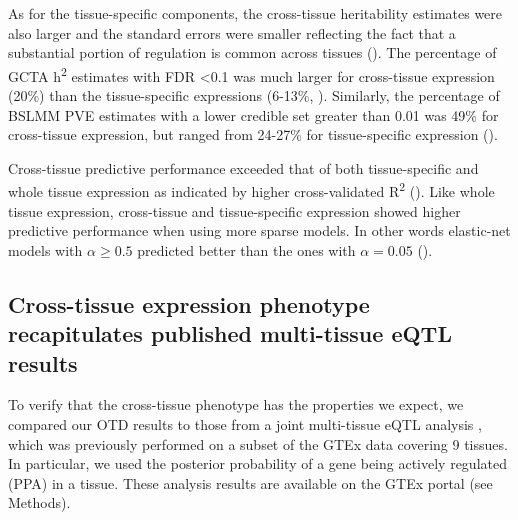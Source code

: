 \documentclass[10pt,letterpaper]{article}
\begin{document}
As for the tissue-specific components, 
the cross-tissue heritability estimates were also larger and the standard errors were smaller reflecting the fact that a substantial portion of regulation is common across tissues (). The percentage of GCTA h\textsuperscript{2} estimates with FDR \textless{0.1}  was much larger for cross-tissue expression (20\%) than the tissue-specific expressions (6-13\%, ). Similarly, the percentage of BSLMM PVE estimates with a lower credible set greater than 0.01 was 49\% for cross-tissue expression, but ranged from 24-27\% for tissue-specific expression ().

Cross-tissue predictive performance exceeded that of both tissue-specific and whole tissue expression as indicated by higher cross-validated R\textsuperscript{2} (). Like whole tissue expression, cross-tissue and tissue-specific expression showed higher predictive performance when using more sparse models. In other words elastic-net models with \(\alpha \geq 0.5\) predicted better than the ones with \(\alpha=0.05\) (). 



\subsection*{Cross-tissue expression phenotype recapitulates published multi-tissue eQTL results}

To verify that the cross-tissue phenotype has the properties we expect, we compared our OTD results to those from a joint multi-tissue eQTL analysis  \cite{Flutre_2013}, which was previously performed on a subset of the GTEx data \cite{Ardlie_2015} covering 9 tissues. In particular, we used the posterior probability of a gene being actively regulated (PPA) in a tissue. These analysis results are available on the GTEx portal (see Methods).
\end{document}
